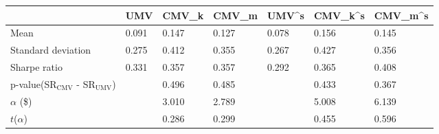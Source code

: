 \begin{tabular}{lllllll}
\toprule
 & UMV & CMV_k & CMV_m & UMV^s & CMV_k^s & CMV_m^s \\
\midrule
Mean & 0.091 & 0.147 & 0.127 & 0.078 & 0.156 & 0.145 \\
Standard deviation & 0.275 & 0.412 & 0.355 & 0.267 & 0.427 & 0.356 \\
Sharpe ratio & 0.331 & 0.357 & 0.357 & 0.292 & 0.365 & 0.408 \\
p-value(SR$_{\text{CMV}}$ - SR$_{\text{UMV}}$) &  & 0.496 & 0.485 &  & 0.433 & 0.367 \\
$\alpha$ (\$) &  & 3.010 & 2.789 &  & 5.008 & 6.139 \\
$t$($\alpha$) &  & 0.286 & 0.299 &  & 0.455 & 0.596 \\
\bottomrule
\end{tabular}
